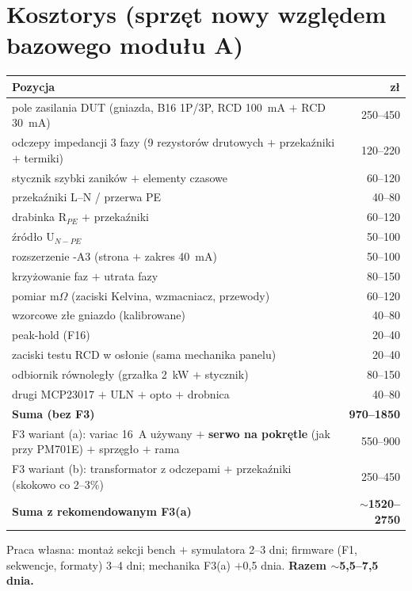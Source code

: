 \documentclass[11pt,a4paper]{article}
\newcommand{\ohm}{$\Omega$}
\begin{document}
\section{Kosztorys (sprzęt nowy względem bazowego modułu A)}
\begin{longtable}{@{}p{}r@{}}
\toprule
\textbf{Pozycja} & \textbf{zł}\\
\midrule
pole zasilania DUT (gniazda, B16 1P/3P, RCD 100~mA $+$ RCD 30~mA) & 250--450\\
odczepy impedancji 3 fazy (9 rezystorów drutowych $+$ przekaźniki $+$ termiki) & 120--220\\
stycznik szybki zaników $+$ elementy czasowe & 60--120\\
przekaźniki L--N / przerwa PE & 40--80\\
drabinka R$_{PE}$ $+$ przekaźniki & 60--120\\
źródło U$_{N-PE}$ & 50--100\\
rozszerzenie -A3 (strona $+$ zakres 40~mA) & 50--100\\
krzyżowanie faz $+$ utrata fazy & 80--150\\
pomiar m\ohm{} (zaciski Kelvina, wzmacniacz, przewody) & 60--120\\
wzorcowe złe gniazdo (kalibrowane) & 40--80\\
peak-hold (F16) & 20--40\\
zaciski testu RCD w osłonie (sama mechanika panelu) & 20--40\\
odbiornik równoległy (grzałka 2~kW $+$ stycznik) & 80--150\\
drugi MCP23017 $+$ ULN $+$ opto $+$ drobnica & 40--80\\
\midrule
\textbf{Suma (bez F3)} & \textbf{970--1850}\\
F3 wariant (a): variac 16~A używany $+$ \textbf{serwo na pokrętle} (jak przy PM701E) $+$ sprzęgło
$+$ rama & 550--900\\
F3 wariant (b): transformator z odczepami $+$ przekaźniki (skokowo co 2--3\%) & 250--450\\
\midrule
\textbf{Suma z rekomendowanym F3(a)} & \textbf{$\sim$1520--2750}\\
\bottomrule
\end{longtable}
Praca własna: montaż sekcji bench $+$ symulatora 2--3 dni; firmware (F1, sekwencje, formaty)
3--4 dni; mechanika F3(a) $+$0,5 dnia. \textbf{Razem $\sim$5,5--7,5 dnia.}
\end{document}
